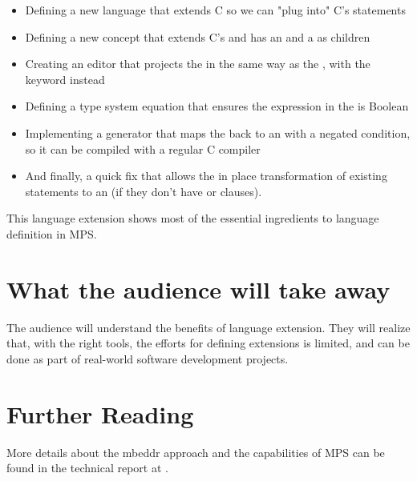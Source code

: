 \documentclass[10pt, conference, compsocconf]{IEEEtran}
\begin{document}
\begin{itemize}
  \item Defining a new language that extends C so we can "plug into" C's
  statements
  \item Defining a new concept  that extends C's
   and has an  and a  as children
  \item Creating an editor that projects the  in the same
  way as the , with the keyword  instead
  \item Defining a type system equation that ensures the expression in the
   is Boolean
  \item Implementing a generator that maps the  back to an 
  with a negated condition, so it can be compiled with a regular C compiler
  \item And finally, a quick fix that allows the in place transformation of
  existing  statements to an  (if they don't have  or  clauses).
\end{itemize}

This language extension shows most of the essential ingredients to language
definition in MPS.

\section{What the audience will take away}
The audience will understand the benefits of language extension. They will
realize that, with the right tools, the efforts for defining extensions is
limited, and can be done as part of real-world software development projects.

\section{Further Reading}
More details about the mbeddr approach and the capabilities of MPS can be found
in the technical report at .

%
\IEEEpeerreviewmaketitle
\end{document}
